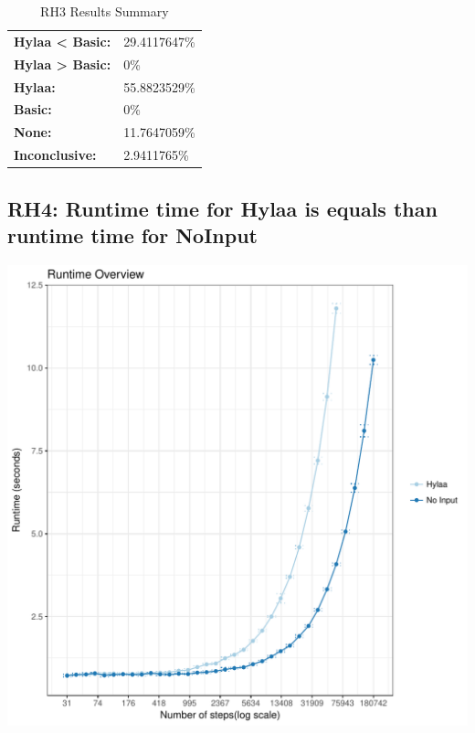 \documentclass{article}\usepackage[]{graphicx}\usepackage[]{color}
\makeatletter
\def\maxwidth{ %
  \ifdim\Gin@nat@width>\linewidth
    \linewidth
  \else
    \Gin@nat@width
  \fi
}
\newenvironment{knitrout}{}{} %
\makeatother
\begin{document}
	\begin{table}[H]
	\centering
	\caption{RH3 Results Summary}
	\begin{tabular}{ll}
	\textbf{Hylaa \textless{} Basic:}& 29.4117647\% \\
	\textbf{Hylaa \textgreater{} Basic:}& 0\%\\
	\textbf{Hylaa:} & 55.8823529\%\\
	\textbf{Basic:} & 0\%\\
	\textbf{None:}& 11.7647059\%\\
	\textbf{Inconclusive:}& 2.9411765\%
			
	
	\end{tabular}
	\end{table}
	
	
	



\subsection{RH4: Runtime time for Hylaa is equals than runtime time for NoInput}


 
\begin{knitrout}
\color{fgcolor}
\includegraphics[width=\maxwidth]{figure/overview_RH4-1} 

\end{knitrout}
 	
\end{document}
